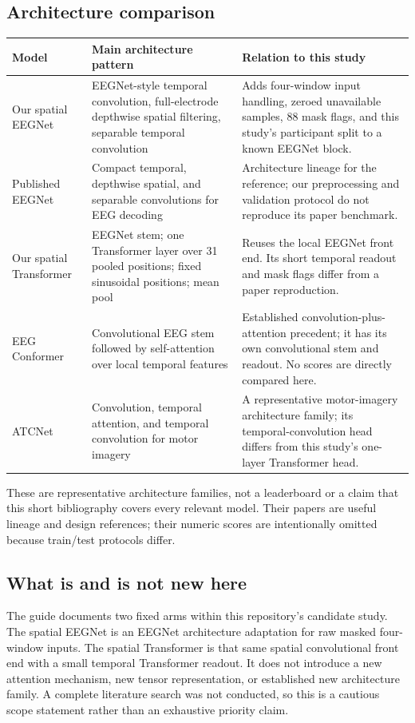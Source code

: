 \documentclass[11pt,a4paper]{article}
\begin{document}
\subsection*{Architecture comparison}
\begin{tabularx}{\linewidth}{@{}L{31mm}L{58mm}Y@{}}
\toprule
Model & Main architecture pattern & Relation to this study \\
\midrule
Our spatial EEGNet & EEGNet-style temporal convolution, full-electrode depthwise spatial filtering, separable temporal convolution & Adds four-window input handling, zeroed unavailable samples, 88 mask flags, and this study's participant split to a known EEGNet block. \\
Published EEGNet \cite{eegnet} & Compact temporal, depthwise spatial, and separable convolutions for EEG decoding & Architecture lineage for the reference; our preprocessing and validation protocol do not reproduce its paper benchmark. \\
Our spatial Transformer & EEGNet stem; one Transformer layer over 31 pooled positions; fixed sinusoidal positions; mean pool & Reuses the local EEGNet front end. Its short temporal readout and mask flags differ from a paper reproduction. \\
EEG Conformer \cite{eegconformer} & Convolutional EEG stem followed by self-attention over local temporal features & Established convolution-plus-attention precedent; it has its own convolutional stem and readout. No scores are directly compared here. \\
ATCNet \cite{atcnet} & Convolution, temporal attention, and temporal convolution for motor imagery & A representative motor-imagery architecture family; its temporal-convolution head differs from this study's one-layer Transformer head. \\
\bottomrule
\end{tabularx}

These are representative architecture families, not a leaderboard or a claim
that this short bibliography covers every relevant model. Their papers are
useful lineage and design references; their numeric scores are intentionally
omitted because train/test protocols differ.

\subsection*{What is and is not new here}
The guide documents two fixed arms within this repository's candidate study.
The spatial EEGNet is an EEGNet architecture adaptation for raw masked
four-window inputs. The spatial Transformer is that same spatial convolutional
front end with a small temporal Transformer readout. It does not introduce a
new attention mechanism, new tensor representation, or established new
architecture family. A complete literature search was not conducted, so this
is a cautious scope statement rather than an exhaustive priority claim.
\end{document}

